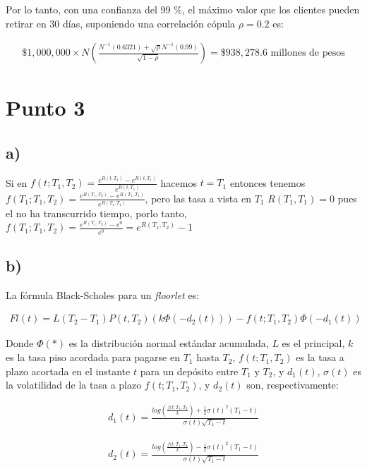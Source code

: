 \documentclass{tufte-handout}
\begin{document}
Por lo tanto, con una confianza del 99 \%, el máximo valor que los clientes pueden retirar en 30 días, suponiendo una correlación cópula $\rho=0.2$ es:

\begin{align*}
\$ 1,000,000 \times N\left(\frac{N^{-1}(0.6321) + \sqrt{\rho}N^{-1}(0.99)}{\sqrt{1-\rho}}\right) = \$ 938,278.6\text{ millones de pesos}
\end{align*}

\section*{Punto 3}

\subsection*{a)}

Si en $f(t;T_1,T_2) = \frac{e^{R(t,T_2)} - e^{R(t,T_1)}}{e^{R(t,T_1)}}$ hacemos $t=T_1$ entonces tenemos $f(T_1;T_1,T_2) = \frac{e^{R(T_1,T_2)} - e^{R(T_1,T_1)}}{e^{R(T_1,T_1)}}$, pero las tasa a vista en $T_1$ $R(T_1,T_1) = 0$ pues el no ha transcurrido tiempo, porlo tanto, $f(T_1;T_1,T_2) = \frac{e^{R(T_1,T_2)} - e^{0}}{e^{0}} = e^{R(T_1,T_2)}  - 1$

\subsection*{b)}

La fórmula Black-Scholes para un \textit{floorlet} es: %

\begin{align*}
Fl(t) = L(T_2-T_1) P(t, T_2) (k \Phi(-d_2(t))) - f(t;T_1,T_2) \Phi(-d_1(t))
\end{align*}

Donde $\Phi(*)$ es la distribución normal estándar acumulada, $L$ es el principal, $k$ es la tasa piso acordada para pagarse en $T_1$ hasta $T_2$, $f(t;T_1,T_2)$ es la tasa a plazo acortada en el instante $t$ para un depósito entre $T_1$ y $T_2$, y $d_1(t)$, $\sigma(t)$ es la volatilidad de la tasa a plazo $f(t;T_1,T_2)$, y $d_2(t)$ son, respectivamente:

\begin{align*}
d_1(t) = \frac{log \left(\frac{f(t;T_1, T_2}{k}\right) + \frac{1}{2} \sigma(t)^2(T_1 - t)}{\sigma(t)\sqrt{T_1-t}}
\end{align*}

\begin{align*}
d_2(t) = \frac{log \left(\frac{f(t;T_1, T_2}{k}\right) - \frac{1}{2} \sigma(t)^2(T_1 - t)}{\sigma(t)\sqrt{T_1-t}}
\end{align*}
\end{document}
